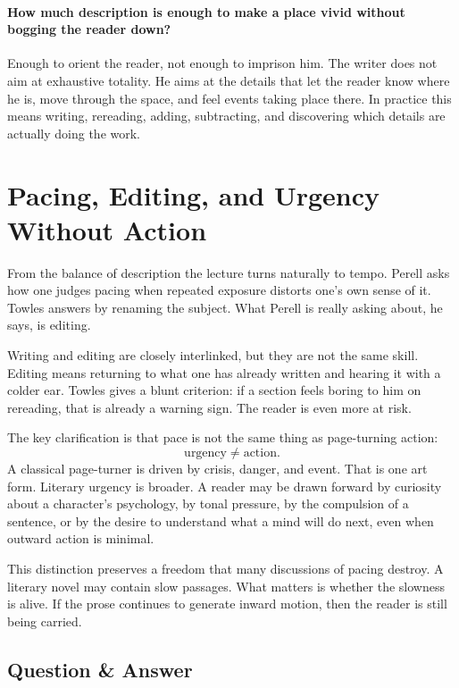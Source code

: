 \paragraph{How much description is enough to make a place vivid without bogging the reader down?}

Enough to orient the reader, not enough to imprison him. The writer does not aim at exhaustive totality. He aims at the details that let the reader know where he is, move through the space, and feel events taking place there. In practice this means writing, rereading, adding, subtracting, and discovering which details are actually doing the work.

\section{Pacing, Editing, and Urgency Without Action}

From the balance of description the lecture turns naturally to tempo. Perell asks how one judges pacing when repeated exposure distorts one's own sense of it. Towles answers by renaming the subject. What Perell is really asking about, he says, is editing.

Writing and editing are closely interlinked, but they are not the same skill. Editing means returning to what one has already written and hearing it with a colder ear. Towles gives a blunt criterion: if a section feels boring to him on rereading, that is already a warning sign. The reader is even more at risk.

The key clarification is that pace is not the same thing as page-turning action:
\begin{equation}
\text{urgency} \neq \text{action}.
\end{equation}
A classical page-turner is driven by crisis, danger, and event. That is one art form. Literary urgency is broader. A reader may be drawn forward by curiosity about a character's psychology, by tonal pressure, by the compulsion of a sentence, or by the desire to understand what a mind will do next, even when outward action is minimal.

This distinction preserves a freedom that many discussions of pacing destroy. A literary novel may contain slow passages. What matters is whether the slowness is alive. If the prose continues to generate inward motion, then the reader is still being carried.

\subsection{Question \& Answer}


